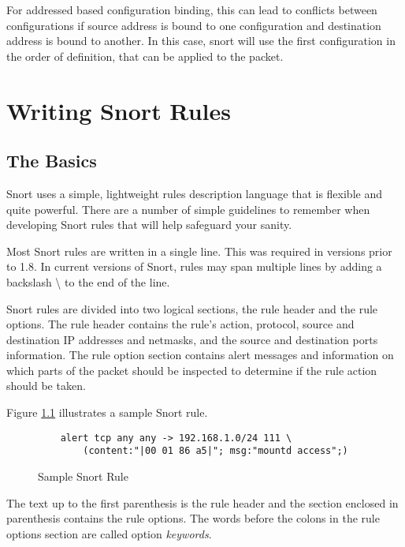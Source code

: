 \documentclass[english]{report}
\begin{document}
For addressed based configuration binding, this can lead to conflicts between configurations 
if source address is bound to one configuration and destination address is bound to another. 
In this case, snort will use the first configuration in the order of definition, that can be 
applied to the packet. 


\chapter{Writing Snort Rules}
\label{Writing Snort Rules}

\section{The Basics}

Snort uses a simple, lightweight rules description language that is flexible
and quite powerful. There are a number of simple guidelines to remember when
developing Snort rules that will help safeguard your sanity.

Most Snort rules are written in a single line. This was required in versions
prior to 1.8. In current versions of Snort, rules may span multiple lines by
adding a backslash \textbackslash{} to the end of the line. 

Snort rules are divided into two logical sections, the rule header and the rule
options. The rule header contains the rule's action, protocol, source and
destination IP addresses and netmasks, and the source and destination ports
information. The rule option section contains alert messages and information on
which parts of the packet should be inspected to determine if the rule action
should be taken.

Figure \ref{Sample Snort Rule} illustrates a sample Snort rule.

\begin{center}
\begin{figure}
\begin{verbatim}
    alert tcp any any -> 192.168.1.0/24 111 \
        (content:"|00 01 86 a5|"; msg:"mountd access";)
\end{verbatim}

\caption{Sample Snort Rule}
\label{Sample Snort Rule}
\end{figure}
\end{center}

The text up to the first parenthesis is the rule header and the section
enclosed in parenthesis contains the rule options. The words before the colons
in the rule options section are called option \emph{keywords}. 
\end{document}
